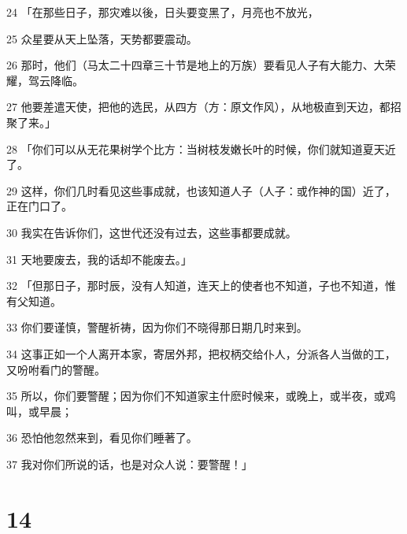 \par 24 「在那些日子，那灾难以後，日头要变黑了，月亮也不放光，
\par 25 众星要从天上坠落，天势都要震动。
\par 26 那时，他们（马太二十四章三十节是地上的万族）要看见人子有大能力、大荣耀，驾云降临。
\par 27 他要差遣天使，把他的选民，从四方（方：原文作风），从地极直到天边，都招聚了来。」
\par 28 「你们可以从无花果树学个比方：当树枝发嫩长叶的时候，你们就知道夏天近了。
\par 29 这样，你们几时看见这些事成就，也该知道人子（人子：或作神的国）近了，正在门口了。
\par 30 我实在告诉你们，这世代还没有过去，这些事都要成就。
\par 31 天地要废去，我的话却不能废去。」
\par 32 「但那日子，那时辰，没有人知道，连天上的使者也不知道，子也不知道，惟有父知道。
\par 33 你们要谨慎，警醒祈祷，因为你们不晓得那日期几时来到。
\par 34 这事正如一个人离开本家，寄居外邦，把权柄交给仆人，分派各人当做的工，又吩咐看门的警醒。
\par 35 所以，你们要警醒；因为你们不知道家主什麽时候来，或晚上，或半夜，或鸡叫，或早晨；
\par 36 恐怕他忽然来到，看见你们睡著了。
\par 37 我对你们所说的话，也是对众人说：要警醒！」

\chapter{14}

